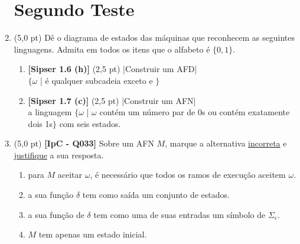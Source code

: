 \documentclass[12pt,a4paper,oneside]{article}
\begin{document}
\begin{enumerate}
	
	\section*{Segundo Teste}
	
	\item (5,0 pt) Dê o diagrama de estados das máquinas que reconhecem as seguintes linguagens. Admita em todos os itens que o alfabeto é  $\{0,1\}$.
	\begin{enumerate}
		\item {\bf [Sipser 1.6 (h)]} (2,5 pt) |Construir um AFD| \\$\{\omega$ | é qualquer subcadeia exceto {\sf 11} e {}$\}$
		\item {\bf [Sipser 1.7 (c)]} (2,5 pt) |Construir um AFN| 
		\\a linguagem $\{\omega$ | $\omega$ contém um número par de 0s ou contém exatamente dois 1s$\}$ com seis estados.
	\end{enumerate}
	
	
	\item (5,0 pt) {\bf [IpC - Q033]} Sobre um AFN $M$, marque a alternativa \underline{incorreta} e \underline{justifique} a sua resposta.
	\begin{enumerate}
		\item para $M$ aceitar $\omega$, é necessário que todos os ramos de execução aceitem $\omega$.		
		\item a sua função $\delta$ tem como saída um conjunto de estados.		
		\item a sua função de $\delta$ tem como uma de suas entradas um símbolo de $\Sigma_{\epsilon}$.		
		\item $M$ tem apenas um estado inicial.
	\end{enumerate}
\end{enumerate}
\end{document}
